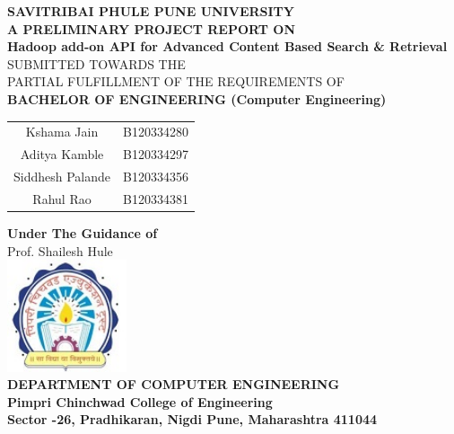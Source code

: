 \documentclass[oneside,a4paper,12pt]{report}
\begin{document}
\setlength{\parindent}{0mm}
\begin{center}
{\bfseries SAVITRIBAI PHULE PUNE UNIVERSITY \\}
 \vspace*{1\baselineskip}
{\bfseries A PRELIMINARY PROJECT REPORT ON \\}
 \vspace*{2\baselineskip}
{\bfseries \fontsize{16}{12} \selectfont Hadoop add-on API for Advanced Content Based Search \& Retrieval \\ \vspace*{2\baselineskip}}
{\fontsize{12}{12} \selectfont SUBMITTED TOWARDS THE
 \\PARTIAL FULFILLMENT OF THE REQUIREMENTS OF \\

\vspace*{2\baselineskip}}
{\bfseries \fontsize{14}{12} \selectfont BACHELOR OF ENGINEERING (Computer
Engineering) \\
\vspace*{1\baselineskip}} 

\begin{tabular}{cc}
Kshama Jain  & B120334280 \\
Aditya Kamble  & B120334297 \\
Siddhesh Palande  & B120334356 \\
Rahul Rao  & B120334381 \\[4ex]
\end{tabular}


\textbf{Under The Guidance of} \\[4ex]
Prof. Shailesh Hule \\[4ex]

\includegraphics[width=100pt]{image_pccoelogo.jpg} \\
{\bfseries \fontsize{14}{12} \selectfont DEPARTMENT OF COMPUTER ENGINEERING \\
Pimpri Chinchwad College of Engineering \\
Sector -26, Pradhikaran, Nigdi Pune, Maharashtra 411044
}
\end{center}

\newpage
\end{document}
